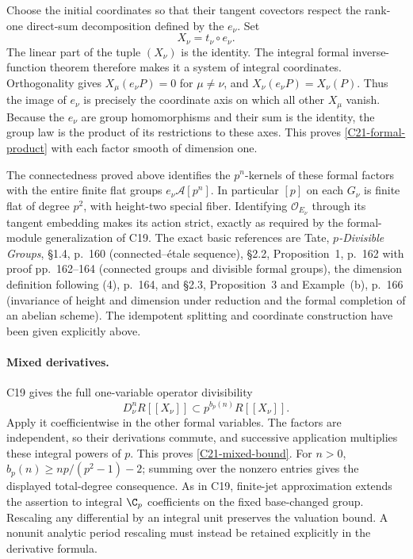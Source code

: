Choose the initial coordinates so that their tangent
covectors respect the rank-one direct-sum decomposition
defined by the $e_\nu$.  Set
\[
 X_\nu=t_\nu\circ e_\nu.
\]
The linear part of the tuple $(X_\nu)$ is the identity.
The integral formal inverse-function theorem therefore makes
it a system of integral coordinates.  Orthogonality gives
$X_\mu(e_\nu P)=0$ for $\mu\ne\nu$, and
$X_\nu(e_\nu P)=X_\nu(P)$.
Thus the image of $e_\nu$ is precisely the coordinate axis
on which all other $X_\mu$ vanish.  Because the $e_\nu$ are
group homomorphisms and their sum is the identity, the group
law is the product of its restrictions to these axes.
This proves \eqref{C21-formal-product} with each factor
smooth of dimension one.

The connectedness proved above identifies the $p^n$-kernels
of these formal factors with the entire finite flat groups
$e_\nu\mathcal A[p^n]$.  In particular $[p]$ on each
$G_\nu$ is finite flat of degree $p^2$, with height-two
special fiber.  Identifying $\mathcal O_{E_\nu}$ through
its tangent embedding makes its action strict, exactly as
required by the formal-module generalization of C19.
The exact basic references are Tate, \emph{$p$-Divisible
Groups}, \S1.4, p.~160 (connected--\'etale sequence),
\S2.2, Proposition~1, p.~162 with proof pp.~162--164
(connected groups and divisible formal groups), the
dimension definition following (4), p.~164, and
\S2.3, Proposition~3 and Example~(b), p.~166
(invariance of height and dimension under reduction and
the formal completion of an abelian scheme).
The idempotent splitting and coordinate construction have
been given explicitly above.

\paragraph{Mixed derivatives.}
C19 gives the full one-variable operator divisibility
\[
 D_\nu^nR[[X_\nu]]\subset
              p^{b_p(n)}R[[X_\nu]].
\]
Apply it coefficientwise in the other formal variables.
The factors are independent, so their derivations commute,
and successive application multiplies these integral powers
of $p$.  This proves \eqref{C21-mixed-bound}.
For $n>0$, $b_p(n)\geq np/(p^2-1)-2$; summing over the
nonzero entries gives the displayed total-degree consequence.
As in C19, finite-jet approximation extends the assertion to
integral $\C_p$ coefficients on the fixed base-changed group.
Rescaling any differential by an integral unit preserves the
valuation bound.  A nonunit analytic period rescaling must
instead be retained explicitly in the derivative formula.


